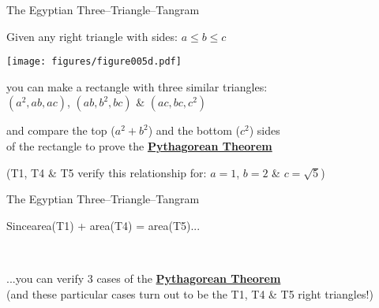 \documentclass[14pt]{beamer}
\begin{document}

    \begin{frame}{The Egyptian Three--Triangle--Tangram}
        \begin{center}
            Given any right triangle with sides: {\small $a \leq b \leq c$}

            \bigskip\bigskip

            \texttt{[image: figures/figure005d.pdf]}

            \bigskip

            {\small you can make a rectangle with three similar triangles:\\{\footnotesize $(a^{2},ab,ac)$,\; $(ab,b^{2},bc)$\; \&\; $(ac,bc,c^{2})$}\\\bigskip

            and compare the top {\footnotesize($a^{2}\!+\!b^{2}$)} and the bottom {\footnotesize($c^{2}$)} sides\\of the rectangle to prove the \textbf{\href{https://en.wikipedia.org/wiki/Pythagorean_theorem}{Pythagorean Theorem}}}

            \bigskip

            {\footnotesize (T1, T4 \& T5 verify this relationship for: $a=1$,\; $b=2$\; \&\; $c=\sqrt{5}$)}
        \end{center}
    \end{frame}


    \begin{frame}{The Egyptian Three--Triangle--Tangram}
        \begin{center}
            Since\quad area(T1) + area(T4) = area(T5)\quad...

            \bigskip \bigskip \bigskip

            \!\!\!\!
            \qquad
             \\

            \bigskip \bigskip

            ...you can verify 3 cases of the \textbf{\href{https://en.wikipedia.org/wiki/Pythagorean_theorem}{Pythagorean Theorem}}\\
            {\footnotesize (and these particular cases turn out to be the T1, T4 \& T5 right triangles!)}
        \end{center}
    \end{frame}
\end{document}
